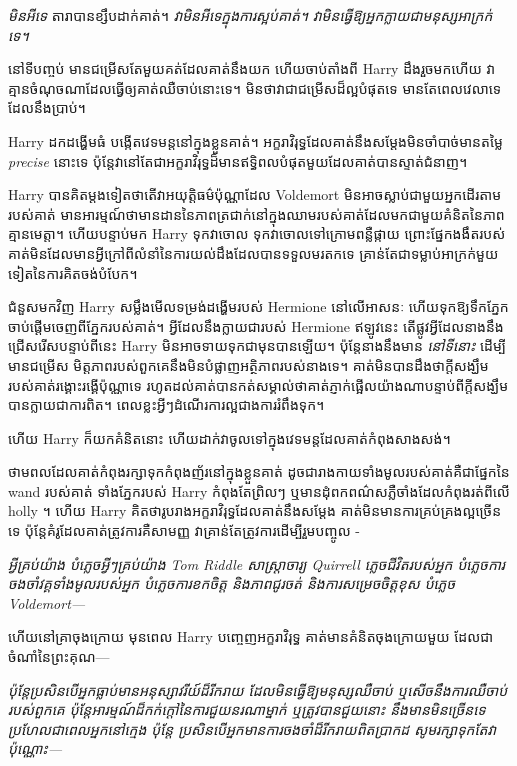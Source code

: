 {\emph{មិនអីទេ} តារាបានខ្សឹបដាក់គាត់។ \emph{វាមិនអីទេក្នុងការស្អប់គាត់។ វាមិនធ្វើឱ្យអ្នកក្លាយជាមនុស្សអាក្រក់ទេ។}

នៅទីបញ្ចប់ មានជម្រើសតែមួយគត់ដែលគាត់នឹងយក ហើយចាប់តាំងពី Harry ដឹងរួចមកហើយ វាគ្មានចំណុចណាដែលធ្វើឲ្យគាត់ឈឺចាប់នោះទេ។ មិនថាវាជាជម្រើសដ៏ល្អបំផុតទេ មានតែពេលវេលាទេដែលនឹងប្រាប់។

Harry ដកដង្ហើមធំ បង្កើតវេទមន្តនៅក្នុងខ្លួនគាត់។ អក្ខរាវិរុទ្ធដែលគាត់នឹងសម្ដែងមិនចាំបាច់មានតម្លៃ \emph{precise} នោះទេ ប៉ុន្តែវានៅតែជាអក្ខរាវិរុទ្ធដ៏មានឥទ្ធិពលបំផុតមួយដែលគាត់បានស្ទាត់ជំនាញ។

Harry បានគិតម្តងទៀតថាតើវាអយុត្តិធម៌ប៉ុណ្ណាដែល Voldemort មិនអាចស្លាប់ជាមួយអ្នកដើរតាមរបស់គាត់ មានអារម្មណ៍ថាមានដាននៃភាពត្រជាក់នៅក្នុងឈាមរបស់គាត់ដែលមកជាមួយគំនិតនៃភាពគ្មានមេត្តា។ ហើយបន្ទាប់មក Harry ទុកវាចោល ទុកវាចោលទៅក្រោមពន្លឺផ្កាយ ព្រោះផ្នែកងងឹតរបស់គាត់មិនដែលមានអ្វីក្រៅពីលំនាំនៃការយល់ដឹងដែលបានទទួលមរតកទេ គ្រាន់តែជាទម្លាប់អាក្រក់មួយទៀតនៃការគិតចង់បំបែក។

ជំនួសមកវិញ Harry សម្លឹងមើលទម្រង់ដង្ហើមរបស់ Hermione នៅលើអាសនៈ ហើយទុកឱ្យទឹកភ្នែកចាប់ផ្តើមចេញពីភ្នែករបស់គាត់។ អ្វីដែលនឹងក្លាយជារបស់ Hermione ឥឡូវនេះ តើផ្លូវអ្វីដែលនាងនឹងជ្រើសរើសបន្ទាប់ពីនេះ Harry មិនអាចទាយទុកជាមុនបានឡើយ។ ប៉ុន្តែនាងនឹងមាន \emph{នៅទីនោះ} ដើម្បីមានជម្រើស មិត្តភាពរបស់ពួកគេនឹងមិនបំផ្លាញអត្ថិភាពរបស់នាងទេ។ គាត់​មិន​បាន​ដឹង​ថា​ក្តី​សង្ឃឹម​របស់​គាត់​រង្គោះ​រង្គើ​ប៉ុណ្ណា​ទេ រហូត​ដល់​គាត់​បាន​កត់​សម្គាល់​ថា​គាត់​ភ្ញាក់​ផ្អើល​យ៉ាង​ណា​បន្ទាប់​ពី​ក្តី​សង្ឃឹម​បាន​ក្លាយ​ជា​ការ​ពិត។ ពេលខ្លះអ្វីៗដំណើរការល្អជាងការរំពឹងទុក។

ហើយ Harry ក៏យកគំនិតនោះ ហើយដាក់វាចូលទៅក្នុងវេទមន្តដែលគាត់កំពុងសាងសង់។

ថាមពលដែលគាត់កំពុងរក្សាទុកកំពុងញ័រនៅក្នុងខ្លួនគាត់ ដូចជារាងកាយទាំងមូលរបស់គាត់គឺជាផ្នែកនៃ wand របស់គាត់ ទាំងភ្នែករបស់ Harry កំពុងតែព្រិលៗ ឬមានដុំពកពណ៌សភ្លឺចាំងដែលកំពុងរត់ពីលើ holly ។ ហើយ Harry គិតថារូបរាងអក្ខរាវិរុទ្ធដែលគាត់នឹងសម្ដែង គាត់មិនមានការគ្រប់គ្រងល្អច្រើនទេ ប៉ុន្តែគំរូដែលគាត់ត្រូវការគឺសាមញ្ញ វាគ្រាន់តែត្រូវការដើម្បីរួមបញ្ចូល -

\emph{អ្វីគ្រប់យ៉ាង បំភ្លេចអ្វីៗគ្រប់យ៉ាង Tom Riddle សាស្ត្រាចារ្យ Quirrell ភ្លេចជីវិតរបស់អ្នក បំភ្លេចការចងចាំវគ្គទាំងមូលរបស់អ្នក បំភ្លេចការខកចិត្ត និងភាពជូរចត់ និងការសម្រេចចិត្តខុស បំភ្លេច Voldemort—}

ហើយនៅគ្រាចុងក្រោយ មុនពេល Harry បញ្ចេញអក្ខរាវិរុទ្ធ គាត់មានគំនិតចុងក្រោយមួយ ដែលជាចំណាំនៃព្រះគុណ—

\emph{ប៉ុន្តែប្រសិនបើអ្នកធ្លាប់មានអនុស្សាវរីយ៍ដ៏រីករាយ ដែលមិនធ្វើឱ្យមនុស្សឈឺចាប់ ឬសើចនឹងការឈឺចាប់របស់ពួកគេ ប៉ុន្តែអារម្មណ៍ដ៏កក់ក្តៅនៃការជួយនរណាម្នាក់ ឬត្រូវបានជួយនោះ នឹងមានមិនច្រើនទេ ប្រហែលជាពេលអ្នកនៅក្មេង ប៉ុន្តែ ប្រសិនបើអ្នកមានការចងចាំដ៏រីករាយពិតប្រាកដ សូមរក្សាទុកតែវាប៉ុណ្ណោះ—}

}
